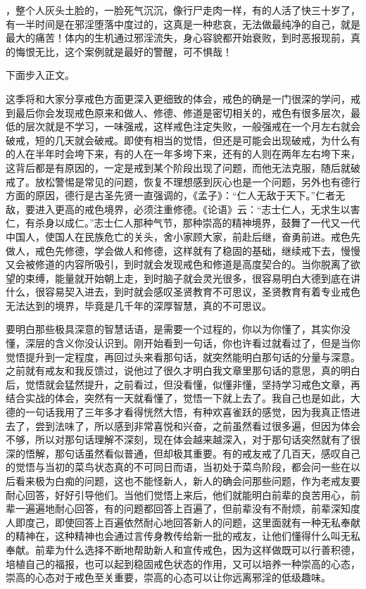 \begin{case}
，整个人灰头土脸的，一脸死气沉沉，像行尸走肉一样，有的人活了快三十岁了，有一半时间是在邪淫堕落中度过的，这真是一种悲哀，无法做最纯净的自己，就是最大的痛苦！体内的生机通过邪淫流失，身心容貌都开始衰败，到时恶报现前，真的悔恨无比，这个案例就是最好的警醒，可不惧哉！
\end{case}

下面步入正文。

这季将和大家分享戒色方面更深入更细致的体会，戒色的确是一门很深的学问，戒到最后你会发现戒色原来和做人、修德、修道是密切相关的，戒色有很多层次，最低的层次就是不学习，一味强戒，这样戒色注定失败，一般强戒在一个月左右就会破戒，短的几天就会破戒。即使有相当的觉悟，但还是可能会出现破戒，为什么有的人在半年时会垮下来，有的人在一年多垮下来，还有的人则在两年左右垮下来，这背后都是有原因的，一定是戒到某个阶段出现了问题，而他无法克服，随后就破戒了。放松警惕是常见的问题，恢复不理想感到灰心也是一个问题，另外也有德行方面的原因，德行是古圣先贤一直强调的，《孟子》：“仁人无敌于天下。”仁者无敌，要进入更高的戒色境界，必须注重修德。《论语》云：“志士仁人，无求生以害仁，有杀身以成仁。”志士仁人那种气节，那种崇高的精神境界，鼓舞了一代又一代中国人，使国人在民族危亡的关头，舍小家顾大家，前赴后继，奋勇前进。戒色先做人，戒色先修德，学会做人和修德，这样就有了稳固的基础，继续戒下去，慢慢又会被修道的内容所吸引，到时就会发现戒色和修道是高度契合的。当你脱离了欲望的束缚，能量就开始朝上走，到时脑子就会灵光很多，很容易明白大德到底在讲什么，很容易契入进去，到时就会感叹圣贤教育不可思议，圣贤教育有着专业戒色无法达到的境界，毕竟是几千年的深厚智慧，真的不可思议。

要明白那些极具深意的智慧话语，是需要一个过程的，你以为你懂了，其实你没懂，深层的含义你没认识到。刚开始看到一句话，你也许看过就看过了，但是当你觉悟提升到一定程度，再回过头来看那句话，就突然能明白那句话的分量与深意。之前就有戒友和我反馈过，说他过了很久才明白我文章里那句话的意思，真的明白后，觉悟就会猛然提升，之前看过，但没看懂，似懂非懂，坚持学习戒色文章，再结合实战的体会，突然有一天就看懂了，觉悟一下就上去了。我自己也是如此，大德的一句话我用了三年多才看得恍然大悟，有种欢喜雀跃的感觉，因为我真正悟进去了，尝到法味了，所以感到非常喜悦和兴奋，之前虽然看过很多遍，但因为体会不够，所以对那句话理解不深刻，现在体会越来越深入，对于那句话突然就有了很深的悟解，那句话虽然看似普通，但却极其重要。有的戒友戒了几百天，感叹自己的觉悟与当初的菜鸟状态真的不可同日而语，当初处于菜鸟阶段，都会问一些在以后看来极为白痴的问题，这也不能怪新人，新人的确会问那些问题，作为老戒友要耐心回答，好好引导他们。当他们觉悟上来后，他们就能明白前辈的良苦用心，前辈一遍遍地耐心回答，有的问题都回答上百遍了，但前辈没有不耐烦，前辈深知度人即度己，即使回答上百遍依然耐心地回答新人的问题，这里面就有一种无私奉献的精神在，这种精神也会通过言传身教传给新一批的戒友，让他们懂得什么叫无私奉献。前辈为什么选择不断地帮助新人和宣传戒色，因为这样做既可以行善积德，培植自己的福报，也可以起到稳固戒色状态的作用，又可以培养一种崇高的心态，崇高的心态对于戒色至关重要，崇高的心态可以让你远离邪淫的低级趣味。

